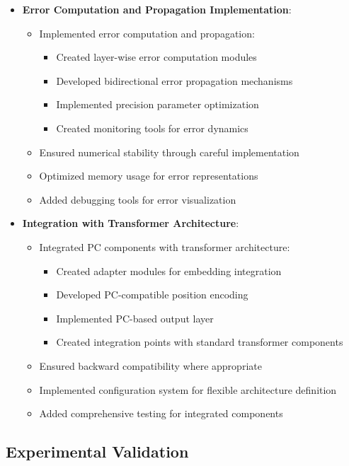 \documentclass{article}
\begin{document}
\begin{itemize}
  \item \textbf{Error Computation and Propagation Implementation}:
  \begin{itemize}
    \item Implemented error computation and propagation:
    \begin{itemize}
      \item Created layer-wise error computation modules
      \item Developed bidirectional error propagation mechanisms
      \item Implemented precision parameter optimization
      \item Created monitoring tools for error dynamics
    \end{itemize}
    \item Ensured numerical stability through careful implementation
    \item Optimized memory usage for error representations
    \item Added debugging tools for error visualization
  \end{itemize}

  \item \textbf{Integration with Transformer Architecture}:
  \begin{itemize}
    \item Integrated PC components with transformer architecture:
    \begin{itemize}
      \item Created adapter modules for embedding integration
      \item Developed PC-compatible position encoding
      \item Implemented PC-based output layer
      \item Created integration points with standard transformer components
    \end{itemize}
    \item Ensured backward compatibility where appropriate
    \item Implemented configuration system for flexible architecture definition
    \item Added comprehensive testing for integrated components
  \end{itemize}
\end{itemize}

\subsection{Experimental Validation}
\end{document}

